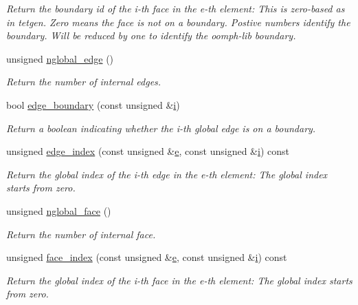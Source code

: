 \begin{DoxyCompactItemize}
\begin{DoxyCompactList}\small\item\em Return the boundary id of the i-\/th face in the e-\/th element\+: This is zero-\/based as in tetgen. Zero means the face is not on a boundary. Postive numbers identify the boundary. Will be reduced by one to identify the oomph-\/lib boundary. \end{DoxyCompactList}\item 
unsigned \hyperlink{classoomph_1_1TetgenScaffoldMesh_a4e92c46493f3ad4c1aadc45fadad3d99}{nglobal\+\_\+edge} ()
\begin{DoxyCompactList}\small\item\em Return the number of internal edges. \end{DoxyCompactList}\item 
bool \hyperlink{classoomph_1_1TetgenScaffoldMesh_a4f1f09422947c46cfbfd699455605ebc}{edge\+\_\+boundary} (const unsigned \&\hyperlink{cfortran_8h_adb50e893b86b3e55e751a42eab3cba82}{i})
\begin{DoxyCompactList}\small\item\em Return a boolean indicating whether the i-\/th global edge is on a boundary. \end{DoxyCompactList}\item 
unsigned \hyperlink{classoomph_1_1TetgenScaffoldMesh_a9fa4f9f34c9f455b6f79a44411278a1f}{edge\+\_\+index} (const unsigned \&\hyperlink{cfortran_8h_a37cd013acc76697829c324bdd8562d82}{e}, const unsigned \&\hyperlink{cfortran_8h_adb50e893b86b3e55e751a42eab3cba82}{i}) const
\begin{DoxyCompactList}\small\item\em Return the global index of the i-\/th edge in the e-\/th element\+: The global index starts from zero. \end{DoxyCompactList}\item 
unsigned \hyperlink{classoomph_1_1TetgenScaffoldMesh_af393ab19a84c1ac3e9799553cbd8b21b}{nglobal\+\_\+face} ()
\begin{DoxyCompactList}\small\item\em Return the number of internal face. \end{DoxyCompactList}\item 
unsigned \hyperlink{classoomph_1_1TetgenScaffoldMesh_af6d0653e21dc39c3731c53f94f6bf7ef}{face\+\_\+index} (const unsigned \&\hyperlink{cfortran_8h_a37cd013acc76697829c324bdd8562d82}{e}, const unsigned \&\hyperlink{cfortran_8h_adb50e893b86b3e55e751a42eab3cba82}{i}) const
\begin{DoxyCompactList}\small\item\em Return the global index of the i-\/th face in the e-\/th element\+: The global index starts from zero. \end{DoxyCompactList}\item 

\end{DoxyCompactItemize}
